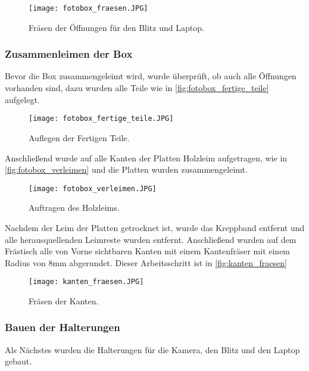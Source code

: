 \begin{figure}[H]
    \centering
    \texttt{[image: fotobox\_fraesen.JPG]}
    \caption{Fräsen der Öffnungen für den Blitz und Laptop.}
    \label{fig:fotobox_fraesen}
\end{figure}

\newpage

\subsubsection{Zusammenleimen der Box}

Bevor die Box zusammengeleimt wird, wurde überprüft, ob auch alle Öffnungen 
vorhanden sind, dazu wurden alle Teile wie in \autoref{fig:fotobox_fertige_teile}
aufgelegt. 

\begin{figure}[H]
    \centering
    \texttt{[image: fotobox\_fertige\_teile.JPG]}
    \caption{Auflegen der Fertigen Teile.}
    \label{fig:fotobox_fertige_teile}
\end{figure}

Anschließend wurde auf alle Kanten der Platten Holzleim aufgetragen, wie in 
\autoref{fig:fotobox_verleimen} und die Platten wurden zusammengeleimt.

\begin{figure}[H]
    \centering
    \texttt{[image: fotobox\_verleimen.JPG]}
    \caption{Auftragen des Holzleims.}
    \label{fig:fotobox_verleimen}
\end{figure}

\newpage

Nachdem der Leim der Platten getrocknet ist, wurde das Kreppband entfernt und
alle herausquellenden Leimreste wurden entfernt. Anschließend wurden auf 
dem Frästisch alle von Vorne sichtbaren Kanten mit einem Kantenfräser mit einem
Radius von 8mm abgerundet. Dieser Arbeitsschritt ist in \autoref{fig:kanten_fraesen}

\begin{figure}[H]
    \centering
    \texttt{[image: kanten\_fraesen.JPG]}
    \caption{Fräsen der Kanten.}
    \label{fig:kanten_fraesen}
\end{figure}

\subsubsection{Bauen der Halterungen}

Als Nächstes wurden die Halterungen für die Kamera, den Blitz und den Laptop gebaut.


